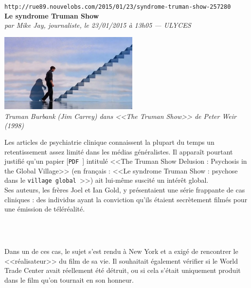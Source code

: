 \documentclass[11pt,twoside,a4paper]{article}
\begin{document}
\setlength\parindent{0pt}

\texttt{http://rue89.nouvelobs.com/2015/01/23/syndrome-truman-show-257280}~\\

\textbf{\LARGE Le syndrome Truman Show} ~\\

\emph{\small par Mike Jay, journaliste, le 23/01/2015 {\`a} 13h05 --- ULYCES } ~\\

\begin{minipage}[ht]{7.00cm}
	\includegraphics[width=6.95cm]{img/1353349429-screen-shot-2011-03-29-at-5-09-52-pm-2.jpg}~\\
	\emph{\footnotesize Truman Burbank (Jim Carrey) dans <<The Truman Show>> de Peter Weir (1998) }
\end{minipage} \hfill \begin{minipage}[ht]{0.65\textwidth}
	Les articles de psychiatrie clinique connaissent la plupart du temps un retentissement assez limit{\'e} dans les m{\'e}dias g{\'e}n{\'e}ralistes. Il appara{\^i}t pourtant justifi{\'e} qu'un papier [\texttt{PDF~\footnotemark}] intitul{\'e} <<The Truman Show Delusion : Psychosis in the Global Village>> (en fran\c{c}ais : <<Le syndrome Truman Show : psychose dans le \texttt{village global~\footnotemark}>>) ait lui-m{\^e}me suscit{\'e} un int{\'e}r{\^e}t global. ~\\

	Ses auteurs, les fr{\`e}res Joel et Ian Gold, y pr{\'e}sentaient une s{\'e}rie frappante de cas cliniques : des individus ayant la conviction qu'ils {\'e}taient secr{\`e}tement film{\'e}s pour une {\'e}mission de t{\'e}l{\'e}r{\'e}alit{\'e}.~\\
\end{minipage}~\\~\\

Dans un de ces cas, le sujet s'est rendu {\`a} New York et a exig{\'e} de rencontrer le <<r{\'e}alisateur>> du film de sa vie. Il souhaitait {\'e}galement v{\'e}rifier si le World Trade Center avait r{\'e}ellement {\'e}t{\'e} d{\'e}truit, ou si cela s'{\'e}tait uniquement produit dans le film qu'on tournait en son honneur.~\\
\end{document}
